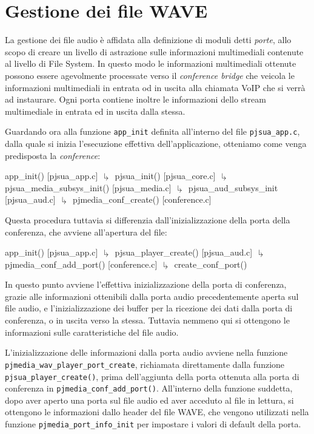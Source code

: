 
\section{Gestione dei file WAVE}
La gestione dei file audio è affidata alla definizione di moduli detti
\textit{porte}, allo scopo di creare un livello di astrazione sulle informazioni
multimediali contenute al livello di File System.
In questo modo le informazioni multimediali ottenute possono essere agevolmente
processate verso il \textit{conference bridge} che veicola le informazioni
multimediali in entrata od in uscita alla chiamata VoIP che si verrà ad instaurare.
Ogni porta contiene inoltre le informazioni dello stream multimediale in
entrata ed in uscita dalla stessa.

Guardando ora alla funzione \texttt{\small app\_init} definita
all'interno del file \texttt{\small pjsua\_app.c}, dalla quale si inizia l'esecuzione
effettiva dell'applicazione, otteniamo come venga predisposta la \textit{conference}:
\begin{bash}[mathescape=true]
app_init() [pjsua_app.c]
$\drsh$ pjsua_init() [pjsua_core.c]
  $\drsh$ pjsua_media_subsys_init() [pjsua_media.c]
    $\drsh$ pjsua_aud_subsys_init [pjsua_aud.c]
      $\drsh$ pjmedia_conf_create() [conference.c]
\end{bash}

Questa procedura tuttavia si differenzia dall'inizializzazione della porta della
conferenza, che avviene all'apertura del file:
\begin{bash}[mathescape=true]
app_init() [pjsua_app.c]
$\drsh$ pjsua_player_create() [pjsua_aud.c]
  $\drsh$ pjmedia_conf_add_port() [conference.c]
    $\drsh$ create_conf_port()
\end{bash}
In questo punto avviene l'effettiva inizializzazione della porta di conferenza,
grazie alle informazioni ottenibili dalla porta audio precedentemente 
aperta sul file audio, e l'inizializzazione dei buffer per la ricezione dei
dati dalla porta di conferenza, o in uscita verso la stessa. Tuttavia nemmeno
qui si ottengono le informazioni sulle caratteristiche del file 
audio. 

L'inizializzazione delle informazioni dalla porta audio avviene nella funzione
\texttt{\small pjmedia\_wav\_player\_port\_create}, richiamata direttamente dalla
funzione \texttt{\small pjsua\_player\_create()}, prima dell'aggiunta della porta
ottenuta alla porta di conferenza in \texttt{\small pjmedia\_conf\_add\_port()}.
All'interno della funzione suddetta, dopo aver aperto una porta sul file audio
ed aver acceduto al file in lettura, si ottengono le informazioni dallo
header del file WAVE, che vengono utilizzati nella funzione 
\texttt{\small pjmedia\_port\_info\_init} per impostare i valori di default della
porta. 


